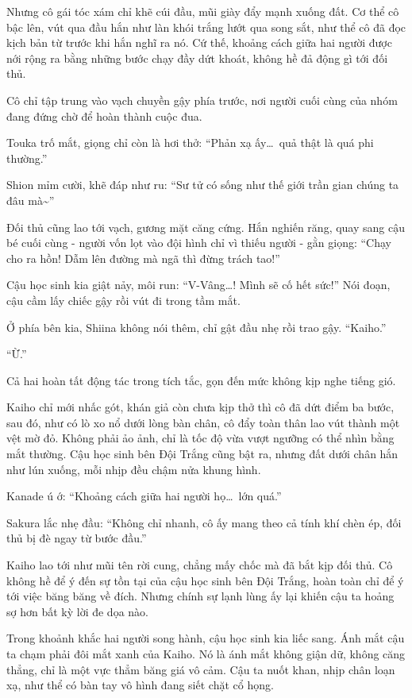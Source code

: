 \documentclass[../main.tex]{subfiles}
\begin{document}
Nhưng cô gái tóc xám chỉ khẽ cúi đầu, mũi giày đẩy mạnh xuống đất.  Cơ thể cô bậc lên, vút qua đầu hắn như làn khói trắng lướt qua song sắt, như thể cô đã đọc kịch bản từ trước khi hắn nghĩ ra nó. Cứ thế, khoảng cách giữa hai người được nới rộng ra bằng những bước chạy đầy dứt khoát, không hề đả động gì tới đối thủ.

Cô chỉ tập trung vào vạch chuyền gậy phía trước, nơi người cuối cùng của nhóm đang đứng chờ để hoàn thành cuộc đua.

Touka trố mắt, giọng chỉ còn là hơi thở: ``Phản xạ ấy\dots\ quả thật là quá phi thường.''

Shion mỉm cười, khẽ đáp như ru: ``Sư tử có sống như thế giới trần gian chúng ta đâu mà\~{}''

Đối thủ cũng lao tới vạch, gương mặt căng cứng. Hắn nghiến răng, quay sang cậu bé cuối cùng - người vốn lọt vào đội hình chỉ vì thiếu người - gằn giọng: ``Chạy cho ra hồn! Dẫm lên đường mà ngã thì đừng trách tao!''

Cậu học sinh kia giật nảy, môi run: ``V-Vâng\dots! Mình sẽ cố hết sức!'' Nói đoạn, cậu cầm lấy chiếc gậy rồi vút đi trong tầm mắt.

Ở phía bên kia, Shiina không nói thêm, chỉ gật đầu nhẹ rồi trao gậy. ``Kaiho.''

``Ừ.''

Cả hai hoàn tất động tác trong tích tắc, gọn đến mức không kịp nghe tiếng gió.

Kaiho chỉ mới nhấc gót, khán giả còn chưa kịp thở thì cô đã dứt điểm ba bước, sau đó, như có lò xo nổ dưới lòng bàn chân, cô đẩy toàn thân lao vút thành một vệt mờ đỏ. Không phải ảo ảnh, chỉ là tốc độ vừa vượt ngưỡng có thể nhìn bằng mắt thường. Cậu học sinh bên Đội Trắng cũng bật ra, nhưng đất dưới chân hắn như lún xuống, mỗi nhịp đều chậm nửa khung hình.

Kanade ú ớ: ``Khoảng cách giữa hai người họ\dots\ lớn quá.''

Sakura lắc nhẹ đầu: ``Không chỉ nhanh, cô ấy mang theo cả tính khí chèn ép, đối thủ bị đè ngay từ bước đầu.''

Kaiho lao tới như mũi tên rời cung, chẳng mấy chốc mà đã bắt kịp đối thủ. Cô không hề để ý đến sự tồn tại của cậu học sinh bên Đội Trắng, hoàn toàn chỉ để ý tới việc băng băng về đích. Nhưng chính sự lạnh lùng ấy lại khiến cậu ta hoảng sợ hơn bất kỳ lời đe dọa nào.

Trong khoảnh khắc hai người song hành, cậu học sinh kia liếc sang. Ánh mắt cậu ta chạm phải đôi mắt xanh của Kaiho. Nó là ánh mắt không giận dữ, không căng thẳng, chỉ là một vực thẳm băng giá vô cảm. Cậu ta nuốt khan, nhịp chân loạn xạ, như thể có bàn tay vô hình đang siết chặt cổ họng.
\end{document}
